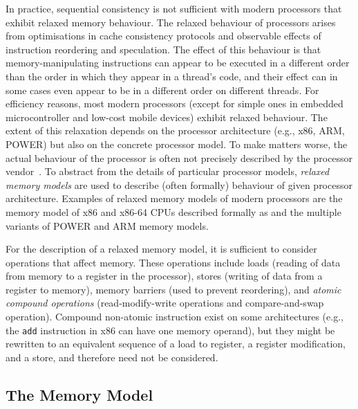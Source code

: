 In practice, sequential consistency is not sufficient with modern processors
that exhibit relaxed memory behaviour.
The relaxed behaviour of processors arises from optimisations in cache
consistency protocols and observable effects of instruction reordering and
speculation.
The effect of this behaviour is that memory-manipulating instructions can appear
to be executed in a different order than the order in which they appear in a
thread's code, and their effect can in some cases even appear to be in
a different order on different threads.
For efficiency reasons, most modern processors (except for simple ones in
embedded microcontroller and low-cost mobile devices) exhibit relaxed behaviour.
The extent of this relaxation depends on the processor architecture (e.g.,
x86, ARM, POWER) but also on the concrete processor model.
To make matters worse, the actual behaviour of the processor is often not
precisely described by the processor vendor~.
To abstract from the details of particular processor models, \emph{relaxed
memory models} are used to describe (often formally) behaviour of given
processor architecture.
Examples of relaxed memory models of modern processors are the memory model of
x86 and x86-64 CPUs described formally as \xtso {} and the multiple
variants of POWER  and
ARM  memory models.

For the description of a relaxed memory model, it is sufficient to consider
operations that affect memory.
These operations include loads (reading of data from memory to a register
in the processor), stores (writing of data from a register to memory),
memory barriers (used to prevent reordering), and \emph{atomic compound
operations} (read-modify-write operations and compare-and-swap operation).
Compound non-atomic instruction exist on some architectures (e.g., the
\texttt{add} instruction in x86 can have one memory operand), but they
might be rewritten to an equivalent sequence of a load to register, a register
modification, and a store, and therefore need not be considered.

\subsection{The \xtso Memory Model\protect\mnotemark}\label{chap:prelim:xtso}%

